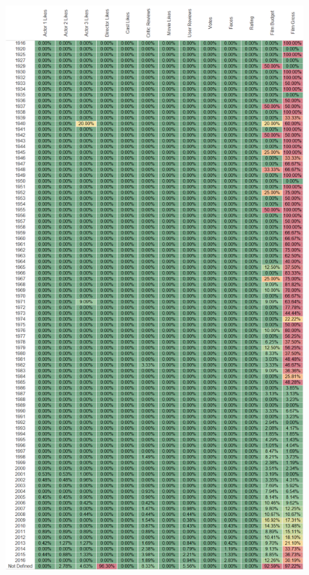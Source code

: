 \documentclass{article}
\begin{document}
\clearpage

\begin{figure}[h]
\centering
\includegraphics[height=0.78\textheight,clip,keepaspectratio]{./images_latex/dataset_quality_metrics}
\label{fig:imdb_num_films_per_year}
\end{figure}
\end{document}
